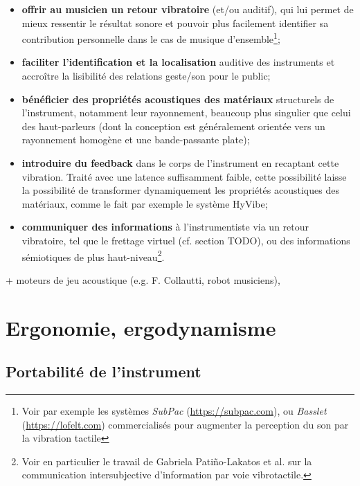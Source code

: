 \vspace{-1em}
\begin{itemize}[noitemsep]
	\item \textbf{offrir au musicien un retour vibratoire} (et/ou auditif), qui lui permet de mieux ressentir le résultat sonore et pouvoir plus facilement identifier sa contribution personnelle dans le cas de musique d'ensemble\footnote{Voir par exemple les systèmes \textit{SubPac} (\url{https://subpac.com}), ou \textit{Basslet} (\url{https://lofelt.com}) commercialisés pour augmenter la perception du son par la vibration tactile};
	\item \textbf{faciliter l'identification et la localisation} auditive des instruments et accroître la lisibilité des relations geste/son pour le public;
	\item \textbf{bénéficier des propriétés acoustiques des matériaux} structurels de l'instrument, notamment leur rayonnement, beaucoup plus singulier que celui des haut-parleurs (dont la conception est généralement orientée vers un rayonnement homogène et une bande-passante plate);
	\item \textbf{introduire du feedback} dans le corps de l'instrument en recaptant cette vibration. Traité avec une latence suffisamment faible, cette possibilité laisse la possibilité de transformer dynamiquement les propriétés acoustiques des matériaux, comme le fait par exemple le système HyVibe;
	\item \textbf{communiquer des informations} à l'instrumentiste via un retour vibratoire, tel que le frettage virtuel (cf. section TODO), ou des informations sémiotiques de plus haut-niveau\footnote{Voir en particulier le travail de Gabriela Patiño-Lakatos et al. \cite{patino-lakatos_paradigmes_2019} sur la communication intersubjective d'information par voie vibrotactile.}.
\end{itemize}


+ moteurs de jeu acoustique (e.g. F. Collautti, robot musiciens), 



\section{Ergonomie, ergodynamisme}

\subsection{Portabilité de l'instrument}

